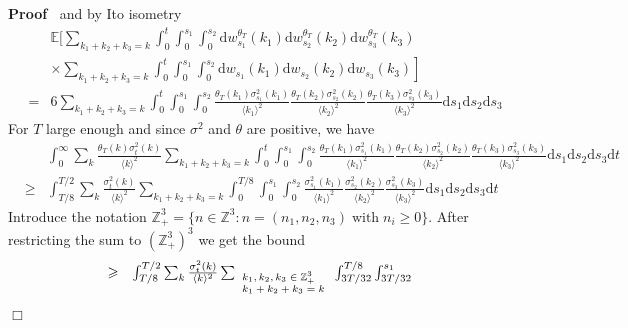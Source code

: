 \documentclass[11pt]{article}
\newcommand{\mathd}{\mathrm{d}}
\newcommand{\tmop}[1]{\ensuremath{\operatorname{#1}}}
\newcommand{\tmscript}[1]{\text{\scriptsize{$#1$}}}
\newenvironment{proof}{\noindent\textbf{Proof\ }}{\hspace*{\fill}$\Box$\medskip}
\begin{document}
\begin{proof}
  and by Ito isometry
  \[ \begin{array}{lll}
       &  & \mathbb{E} \left. \Biggl[ \sum_{k_1 + k_2 + k_3 = k} \int^t_0
       \int^{s_1}_0 \int^{s_2}_0 \mathd w_{s_1}^{\theta_T} (k_1) \mathd
       w_{s_2}^{\theta_T} (k_2) \mathd w^{\theta_T}_{s_3} (k_3)  \right.\\
       &  & \times \sum_{k_1 + k_2 + k_3 = k} \left. \int^t_0 \int^{s_1}_0
       \int^{s_2}_0 \mathd w_{s_1} (k_1) \mathd w_{s_2} (k_2) \mathd w_{s_3}
       (k_3) \right]\\
       & = & 6 \sum_{k_1 + k_2 + k_3 = k} \int^t_0 \int^{s_1}_0 \int^{s_2}_0
       \frac{\theta_T (k_1) \sigma^2_{s_1} (k_1)}{\langle k_1 \rangle^2}
       \frac{\theta_T (k_2) \sigma^2_{s_2} (k_2)}{\langle k_2 \rangle^2}
       \frac{\theta_T (k_3) \sigma^2_{s_3} (k_3)}{\langle k_3 \rangle^2}
       \mathd s_1 \mathd s_2 \mathd s_3
     \end{array} \]
  For $T$ large enough and since $\sigma^2$ and $\theta$ are positive, we have
  {\footnotesize
  \begin{eqnarray*}
    &  & \int^{\infty}_0 \sum_k \frac{\theta_T (k) \sigma^2_t (k)}{\langle k
    \rangle^2} \sum_{k_1 + k_2 + k_3 = k} \int^t_0 \int^{s_1}_0 \int^{s_2}_0
    \frac{\theta_T (k_1) \sigma^2_{s_1} (k_1)}{\langle k_1 \rangle^2}
    \frac{\theta_T (k_2) \sigma^2_{s_2} (k_2)}{\langle k_2 \rangle^2}
    \frac{\theta_T (k_3) \sigma^2_{s_3} (k_3)}{\langle k_3 \rangle^2} \mathd
    s_1 \mathd s_2 \mathd s_3 \mathd t\\
    & \geqslant & \int^{T / 2}_{T / 8} \sum_k \frac{\sigma^2_t (k)}{\langle k
    \rangle^2} \sum_{k_1 + k_2 + k_3 = k} \int^{T / 8}_0 \int^{s_1}_0
    \int^{s_2}_0 \frac{\sigma^2_{s_1} (k_1)}{\langle k_1 \rangle^2}
    \frac{\sigma^2_{s_2} (k_2)}{\langle k_2 \rangle^2} \frac{\sigma^2_{s_3}
    (k_3)}{\langle k_3 \rangle^2} \mathd s_1 \mathd s_2 \mathd s_3 \mathd t
  \end{eqnarray*}}
  Introduce the notation $\mathbb{Z}_+^3 = \{ n \in \mathbb{Z}^3 : n = (n_1,
  n_2, n_3) \tmop{with} n_i \geqslant 0 \}$. After restricting the sum to
  $(\mathbb{Z}_+^3)^3$ we get the bound
  {\footnotesize
  \[ \begin{array}{ll}
       \geqslant & \int^{T / 2}_{T / 8} \sum_k \frac{\sigma^2_t (k)}{\langle k
       \rangle^2} \sum_{\tmscript{\begin{array}{l}
         k_1, k_2, k_3 \in \mathbb{Z}_+^3\\
         k_1 + k_2 + k_3 = k
       \end{array}}} \int^{T / 8}_{3 T / 32} \int^{s_1}_{3 T / 32}

\end{array}\]}
\end{proof}
\end{document}
